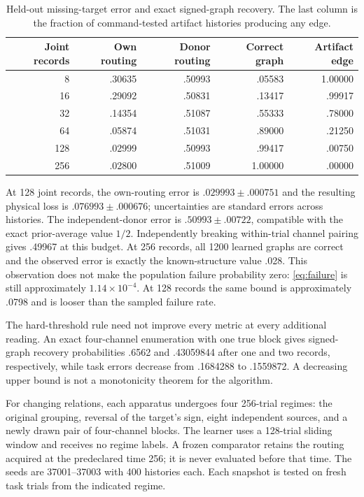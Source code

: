 \documentclass[11pt]{article}
\theoremstyle{definition}
\theoremstyle{remark}
\begin{document}
\begin{table}[ht]
\centering
\caption{Held-out missing-target error and exact signed-graph recovery. The last column is the fraction of command-tested artifact histories producing any edge.}
\label{tab:static}
\begin{tabular}{rrrrr}
\toprule
Joint records & Own routing & Donor routing & Correct graph & Artifact edge\\
\midrule
8   & .30635 & .50993 & .05583 & 1.00000\\
16  & .29092 & .50831 & .13417 & .99917\\
32  & .14354 & .51087 & .55333 & .78000\\
64  & .05874 & .51031 & .89000 & .21250\\
128 & .02999 & .50993 & .99417 & .00750\\
256 & .02800 & .51009 & 1.00000 & .00000\\
\bottomrule
\end{tabular}
\end{table}

At 128 joint records, the own-routing error is $.029993\pm.000751$ and the resulting physical loss is $.076993\pm.000676$; uncertainties are standard errors across histories. The independent-donor error is $.50993\pm.00722$, compatible with the exact prior-average value $1/2$. Independently breaking within-trial channel pairing gives .49967 at this budget. At 256 records, all 1200 learned graphs are correct and the observed error is exactly the known-structure value .028. This observation does not make the population failure probability zero: \eqref{eq:failure} is still approximately $1.14\times10^{-4}$. At 128 records the same bound is approximately .0798 and is looser than the sampled failure rate.

The hard-threshold rule need not improve every metric at every additional reading. An exact four-channel enumeration with one true block gives signed-graph recovery probabilities .6562 and .43059844 after one and two records, respectively, while task errors decrease from .1684288 to .1559872. A decreasing upper bound is not a monotonicity theorem for the algorithm.

For changing relations, each apparatus undergoes four 256-trial regimes: the original grouping, reversal of the target's sign, eight independent sources, and a newly drawn pair of four-channel blocks. The learner uses a 128-trial sliding window and receives no regime labels. A frozen comparator retains the routing acquired at the predeclared time 256; it is never evaluated before that time. The seeds are 37001--37003 with 400 histories each. Each snapshot is tested on fresh task trials from the indicated regime.
\end{document}
